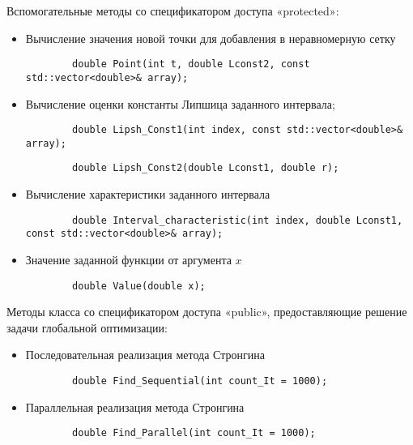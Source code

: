 \documentclass{report}
\begin{document}
	 Вспомогательные методы со спецификатором доступа «protected»:\par
\begin{itemize}	 
	\item Вычисление значения новой точки для добавления в неравномерную сетку \par
	\begin{lstlisting}
		double Point(int t, double Lconst2, const std::vector<double>& array);
	\end{lstlisting}\par
    \item Вычисление оценки константы Липшица заданного интервала; \par
	\begin{lstlisting}
		double Lipsh_Const1(int index, const std::vector<double>& array);
	\end{lstlisting}\par
		\begin{lstlisting}
		double Lipsh_Const2(double Lconst1, double r);
	\end{lstlisting}\par
	\item Вычисление характеристики заданного интервала \par
	\begin{lstlisting}
		double Interval_characteristic(int index, double Lconst1, const std::vector<double>& array);
	\end{lstlisting}\par
	\item Значение заданной функции от аргумента $x$ \par
	\begin{lstlisting}
		double Value(double x);
	\end{lstlisting}\par
\end{itemize}

    Методы класса со спецификатором доступа «public», предоставляющие решение задачи глобальной оптимизации:\par
    \begin{itemize}
	\item Последовательная реализация метода Стронгина \par	
	\begin{lstlisting}
		double Find_Sequential(int count_It = 1000);
	\end{lstlisting}\par
	\item Параллельная реализация метода Стронгина \par	
	\begin{lstlisting}
		double Find_Parallel(int count_It = 1000);
	\end{lstlisting}\par
\end{itemize}
\newpage
\end{document}
